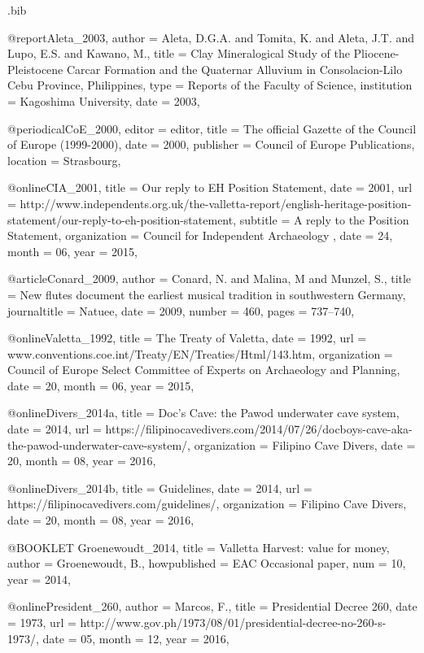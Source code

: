 \begin{filecontents}{\IJSRAidentifier.bib}

@report{Aleta_2003,
	author = {Aleta, D.G.A. and Tomita, K. and Aleta, J.T. and Lupo, E.S. and Kawano, M.},
	title = {Clay Mineralogical Study of the Pliocene-Pleistocene Carcar Formation and the Quaternar Alluvium in Consolacion-Lilo Cebu Province, Philippines},
	type = {Reports of the Faculty of Science},
	institution = {Kagoshima University},
	date = {2003},
}

@periodical{CoE_2000,
	editor = {editor},
	title = {The official Gazette of the Council of Europe (1999-2000)},
	date = {2000},
	publisher = {Council of Europe Publications},
	location = {Strasbourg},
}

@online{CIA_2001,
	title = {Our reply to EH Position Statement},
	date = {2001},
	url = {http://www.independents.org.uk/the-valletta-report/english-heritage-position-statement/our-reply-to-eh-position-statement},
	subtitle = {A reply to the Position Statement},
	organization = {Council for Independent Archaeology },
	date = {24},
	month = {06},
	year = {2015},
}

@article{Conard_2009,
	author = {Conard, N. and Malina, M and Munzel, S.},
	title = {New flutes document the earliest musical tradition in southwestern Germany},
	journaltitle = {Natuee},
	date = {2009},
	number = {460},
	pages = {737--740},
}

@online{Valetta_1992,
	title = {The Treaty of Valetta},
	date = {1992},
	url = {www.conventions.coe.int/Treaty/EN/Treaties/Html/143.htm},
	organization = {Council of Europe Select Committee of Experts on Archaeology and Planning},
	date = {20},
	month = {06},
	year = {2015},
}

@online{Divers_2014a,
	title = {Doc’s Cave: the Pawod underwater cave system},
	date = {2014},
	url = {https://filipinocavedivers.com/2014/07/26/docboys-cave-aka-the-pawod-underwater-cave-system/},
	organization = {Filipino Cave Divers},
	date = {20},
	month = {08},
	year = {2016},
}

@online{Divers_2014b,
	title = {Guidelines},
	date = {2014},
	url = {https://filipinocavedivers.com/guidelines/},
	organization = {Filipino Cave Divers},
	date = {20},
	month = {08},
	year = {2016},
}

@BOOKLET {Groenewoudt_2014,
	title        = {Valletta Harvest: value for money},
	author       = {Groenewoudt, B.},
	howpublished = {EAC Occasional paper},
	num          = {10},
	year 		 = {2014},
}

@online{President_260,
	author = {Marcos, F.},
	title = {Presidential Decree 260},
	date = {1973},
	url = {http://www.gov.ph/1973/08/01/presidential-decree-no-260-s-1973/},
	date = {05},
	month = {12},
	year = {2016},
}


\end{filecontents}
